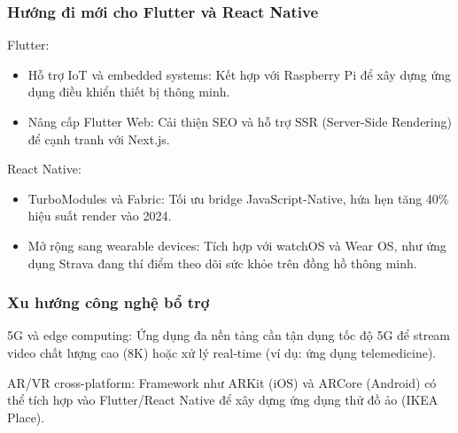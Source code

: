 \subsubsection{Hướng đi mới cho Flutter và React Native}
    \begin{flushleft}
      \hspace*{0.8cm}Flutter:
      \setlength{\leftmargini}{1.5cm}
      \begin{itemize}
        \item Hỗ trợ IoT và embedded systems: Kết hợp với Raspberry Pi để xây dựng ứng dụng điều khiển thiết bị thông minh.
        \item Nâng cấp Flutter Web: Cải thiện SEO và hỗ trợ SSR (Server-Side Rendering) để cạnh tranh với Next.js.
      \end{itemize}
    \end{flushleft}

    \begin{flushleft}
      \hspace*{0.8cm}React Native:
      \setlength{\leftmargini}{1.5cm}
      \begin{itemize}
          \item TurboModules và Fabric: Tối ưu bridge JavaScript-Native, hứa hẹn tăng 40\% hiệu suất render vào 2024.
          \item Mở rộng sang wearable devices: Tích hợp với watchOS và Wear OS, như ứng dụng Strava đang thí điểm theo dõi sức khỏe trên đồng hồ thông minh.
      \end{itemize}
    \end{flushleft}

    \subsubsection{Xu hướng công nghệ bổ trợ}
    \begin{flushleft}
      \hspace*{0.8cm}5G và edge computing: Ứng dụng đa nền tảng cần tận dụng tốc độ 5G để stream video chất lượng cao (8K) hoặc xử lý real-time (ví dụ: ứng dụng telemedicine).
    \end{flushleft}

    \begin{flushleft}
      \hspace*{0.8cm}AR/VR cross-platform: Framework như ARKit (iOS) và ARCore (Android) có thể tích hợp vào Flutter/React Native để xây dựng ứng dụng thử đồ ảo (IKEA Place).
    \end{flushleft}

